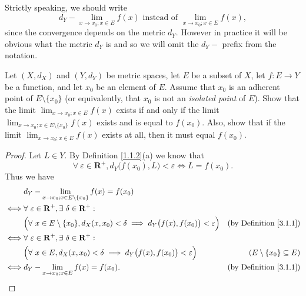 \begin{remark}\label{3.1.8}
    Strictly speaking, we should write
    \[
        d_Y - \lim_{x \to x_0 ; x \in E} f(x) \text{ instead of } \lim_{x \to x_0 ; x \in E} f(x),
    \]
    since the convergence depends on the metric \(d_Y\).
    However in practice it will be obvious what the metric \(d_Y\) is and so we will omit the \(d_Y -\) prefix from the notation.
\end{remark}

\exercisesection

\begin{exercise}\label{ex 3.1.1}
    Let \((X, d_X)\) and \((Y, d_Y)\) be metric spaces, let \(E\) be a subset of \(X\), let \(f : E \to Y\) be a function, and let \(x_0\) be an element of \(E\).
    Assume that \(x_0\) is an adherent point of \(E \setminus \{x_0\}\)
    (or equivalently, that \(x_0\) is not an \emph{isolated point} of \(E\)).
    Show that the limit \(\lim_{x \to x_0 ; x \in E} f(x)\) exists if and only if the limit \(\lim_{x \to x_0 ; x \in E \setminus \{x_0\}} f(x)\) exists and is equal to \(f(x_0)\).
    Also, show that if the limit \(\lim_{x \to x_0 ; x \in E} f(x)\) exists at all, then it must equal \(f(x_0)\).
\end{exercise}

\begin{proof}
    Let \(L \in Y\).
    By Definition \ref{1.1.2}(a) we know that
    \[
        \forall\ \varepsilon \in \mathbf{R}^+, d_Y\big(f(x_0), L\big) < \varepsilon \iff L = f(x_0).
    \]
    Thus we have
    \begin{align*}
             & d_Y - \lim_{x \to x_0 ; x \in E \setminus \{x_0\}} f(x) = f(x_0)                                                                                         \\
        \iff & \forall\ \varepsilon \in \mathbf{R}^+, \exists\ \delta \in \mathbf{R}^+ :                                                                                \\
             & \Big(\forall\ x \in E \setminus \{x_0\}, d_X(x, x_0) < \delta \implies d_Y\big(f(x), f(x_0)\big) < \varepsilon\Big) & \text{(by Definition \ref{3.1.1})} \\
        \iff & \forall\ \varepsilon \in \mathbf{R}^+, \exists\ \delta \in \mathbf{R}^+ :                                                                                \\
             & \Big(\forall\ x \in E, d_X(x, x_0) < \delta \implies d_Y\big(f(x), f(x_0)\big) < \varepsilon\Big)                   & (E \setminus \{x_0\} \subseteq E)  \\
        \iff & d_Y - \lim_{x \to x_0 ; x \in E} f(x) = f(x_0).                                                                     & \text{(by Definition \ref{3.1.1})}
    \end{align*}
\end{proof}

